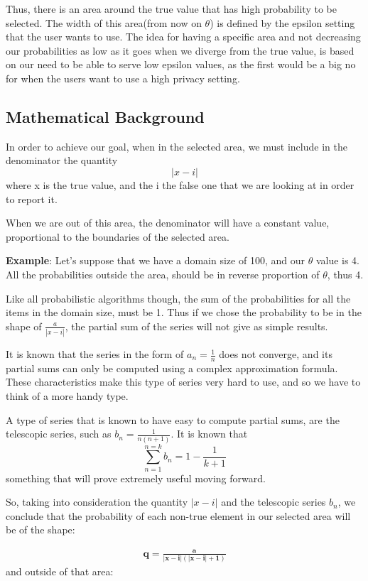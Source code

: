 Thus, there is an area around the true value that has high probability to be selected. The width of this area(from now on $\theta$) is defined by the epsilon setting that the user wants to use. The idea for having a specific area and not decreasing our probabilities as low as it goes when we diverge from the true value, is based on our need to be able to serve low epsilon values, as the first would be a big no for when the users want to use a high privacy setting.

\subsection{Mathematical Background}

In order to achieve our goal, when in the selected area, we must include in the denominator the quantity 
$$
|x - i|
$$
where x is the true value, and the i the false one that we are looking at in order to report it.

When we are out of this area, the denominator will have a constant value, proportional to the boundaries of the selected area. 

\textbf{Example}: Let's suppose that we have a domain size of 100, and our $\theta$ value is 4. All the probabilities outside the area, should be in reverse proportion of $\theta$, thus 4.

Like all probabilistic algorithms though, the sum of the probabilities for all the items in the domain size, must be 1. Thus if we chose the probability to be in the shape of $\frac{a}{|x-i|}$, the partial sum of the series will not give as simple results.

It is known that the series in the form of $a_n = \frac{1}{n}$ does not converge, and its partial sums can only be computed using a complex approximation formula. These characteristics make this type of series very hard to use, and so we have to think of a more handy type.


A type of series that is known to have easy to compute partial sums, are the telescopic series, such as $b_n = \frac{1}{n (n+1)}$. It is known that 
$$
\sum_{n = 1}^{n = k} b_n = 1 - \frac{1}{k + 1}
$$
something that will prove extremely useful moving forward.

So, taking into consideration the quantity $|x - i|$ and the telescopic series $b_n$, we conclude that the probability of each non-true element in our selected area will be of the shape:

\begin{align}
    \mathbf{q = \frac{a}{|x-i|(|x-i| + 1)}}
\end{align}
and outside of that area:

